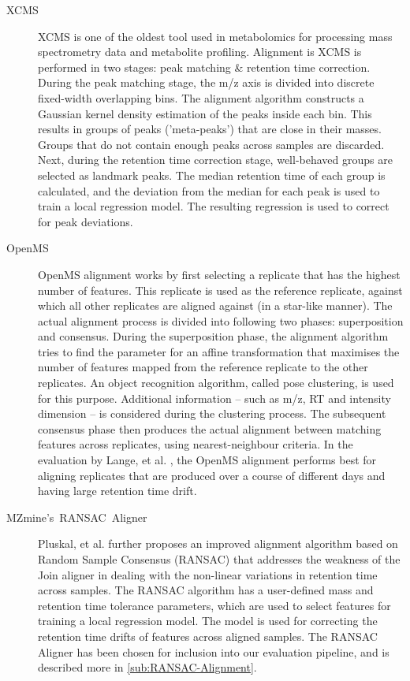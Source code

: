 \begin{description}

\item [{XCMS~\cite{Smith2006}}] XCMS is one of the oldest tool used in metabolomics for processing mass spectrometry data and metabolite profiling. Alignment is XCMS is performed in two stages: peak matching \& retention time correction. During the peak matching stage, the m/z axis is divided into discrete fixed-width overlapping bins. The alignment algorithm constructs a Gaussian kernel density estimation of the peaks inside each bin. This results in groups of peaks ('meta-peaks') that are close in their masses. Groups that do not contain enough peaks across samples are discarded. Next, during the retention time correction stage, well-behaved groups are selected as landmark peaks. The median retention time of each group is calculated, and the deviation from the median for each peak is used to train a local regression model. The resulting regression is used to correct for peak deviations.

\item [{OpenMS~\cite{Lange2007}}] OpenMS alignment works by first selecting a replicate that has the highest number of features. This replicate is used as the reference replicate, against which all other replicates are aligned against (in a star-like manner). The actual alignment process is divided into following two phases: superposition and consensus. During the superposition phase, the alignment algorithm tries to find the parameter for an affine transformation that maximises the number of features mapped from the reference replicate to the other replicates. An object recognition algorithm, called pose clustering, is used for this purpose. Additional information -- such as m/z, RT and intensity dimension -- is considered during the clustering process. The subsequent consensus phase then produces the actual alignment between matching features across replicates, using nearest-neighbour criteria. In the evaluation by Lange, et al. \cite{Lange2008}, the OpenMS alignment performs best for aligning replicates that are produced over a course of different days and having large retention time drift.

\item [{MZmine's~RANSAC~Aligner~\cite{Pluskal2010}}] Pluskal, et al. further proposes an improved alignment algorithm based on Random Sample Consensus (RANSAC) that addresses the weakness of the Join aligner in dealing with the non-linear variations in retention time across samples. The RANSAC algorithm has a user-defined mass and retention time tolerance parameters, which are used to select features for training a local regression model. The model is used for correcting the retention time drifts of features across aligned samples. The RANSAC Aligner has been chosen for inclusion into our evaluation pipeline, and is described more in \ref{sub:RANSAC-Alignment}.

\end{description}

